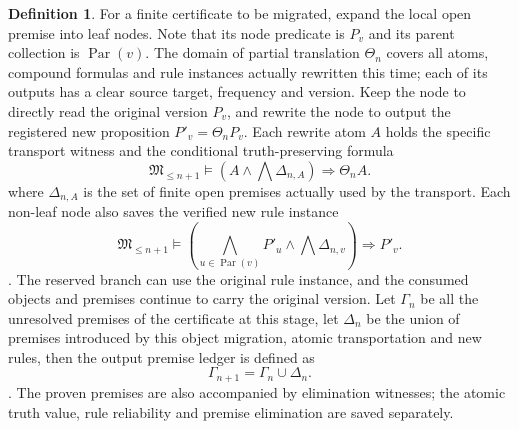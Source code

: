\documentclass[12pt,a4paper,openany,notitlepage]{report}
\theoremstyle{plain}
\theoremstyle{definition}
\newtheorem{definition}[theorem]{Definition}
\theoremstyle{remark}
\begin{document}
\begin{CJK*}
\begin{definition}
For a finite certificate to be migrated, expand the local open premise into leaf nodes. Note that its node predicate is $P_v$ and its parent collection is $\operatorname{Par}(v)$. The domain of partial translation $\Theta_n$ covers all atoms, compound formulas and rule instances actually rewritten this time; each of its outputs has a clear source target, frequency and version. Keep the node to directly read the original version $P_v$, and rewrite the node to output the registered new proposition $P'_v=\Theta_nP_v$. Each rewrite atom $A$ holds the specific transport witness and the conditional truth-preserving formula \[
 \mathfrak M_{\le n+1}\models
 \left(A\land\bigwedge\Delta_{n,A}\right)\Rightarrow\Theta_nA.
\] where $\Delta_{n,A}$ is the set of finite open premises actually used by the transport. Each non-leaf node also saves the verified new rule instance \[
 \mathfrak M_{\le n+1}\models
 \left(
 \bigwedge_{u\in\operatorname{Par}(v)}P'_u
 \land\bigwedge\Delta_{n,v}
 \right)\Rightarrow P'_v.
\]. The reserved branch can use the original rule instance, and the consumed objects and premises continue to carry the original version. Let $\Gamma_n$ be all the unresolved premises of the certificate at this stage, let $\Delta_n$ be the union of premises introduced by this object migration, atomic transportation and new rules, then the output premise ledger is defined as \[
 \Gamma_{n+1}=\Gamma_n\cup\Delta_n.
\]. The proven premises are also accompanied by elimination witnesses; the atomic truth value, rule reliability and premise elimination are saved separately.\end{definition}



\end{CJK*}
\end{document}
